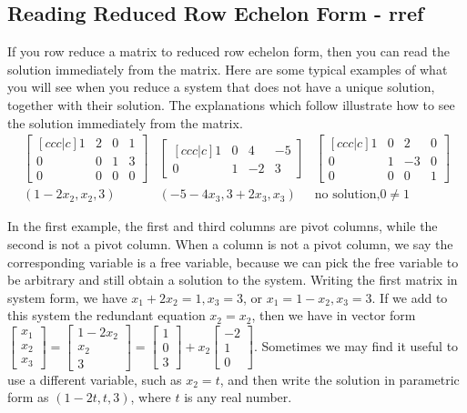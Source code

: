 \documentclass[10pt]{article}
\begin{document}
\subsection{Reading Reduced Row Echelon Form - rref}

If you row reduce a matrix to reduced row echelon form, then you can read the solution immediately from the matrix.  Here are some typical examples of what you will see when you reduce a system that does not have a unique solution, together with their solution. The explanations which follow illustrate how to see the solution immediately from the matrix.
$$\begin{array}{ccc}
 \begin{bmatrix}[ccc|c] 1&2&0&1\\0&0&1&3
\\0&0&0&0\end{bmatrix} 
& \begin{bmatrix}[ccc|c] 1&0&4&-5\\0&1&-2&3
\end{bmatrix} 
& \begin{bmatrix}[ccc|c] 1&0&2&0\\0&1&-3&0
\\0&0&0&1\end{bmatrix} 
\\
(1-2x_2,x_2,3)
&(-5-4x_3,3+2x_3,x_3)
&\text{no solution,} 0\neq1
\end{array}
$$

In the first example, the first and third columns are pivot columns, while the second is not a pivot column. When a column is not a pivot column, we say the corresponding variable is a free variable, because we can pick the free variable to be arbitrary and still obtain a solution to the system.  Writing the first matrix in system form, we have $x_1+2x_2 =1,x_3=3$, or $x_1=1-x_2,x_3=3$.  If we add to this system the redundant equation $x_2=x_2$, then we have in vector form 
$\begin{bmatrix}x_1\\x_2\\x_3\end{bmatrix} = \begin{bmatrix}1-2x_2\\x_2\\3\end{bmatrix} = \begin{bmatrix}1\\0\\3\end{bmatrix} + x_2 \begin{bmatrix}-2\\1\\0\end{bmatrix}$. Sometimes we may find it useful to use a different variable, such as $x_2=t$, and then write the solution in parametric form as $(1-2t,t,3)$, where $t$ is any real number.
 
\end{document}
